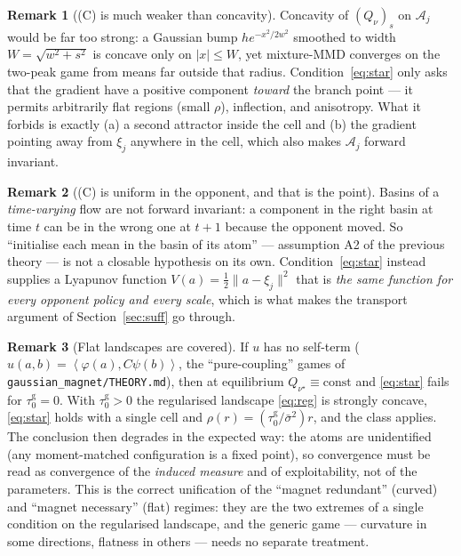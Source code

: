 \documentclass[11pt]{article}
\theoremstyle{definition}
\newtheorem{remark}{Remark}
\newcommand{\cA}{\mathcal{A}}
\newcommand{\ip}[2]{\left\langle #1, #2 \right\rangle}
\begin{document}
\begin{remark}[(C) is much weaker than concavity]
Concavity of $(Q_\nu)_s$ on $\cA_j$ would be far too strong: a Gaussian bump
$h e^{-x^2/2w^2}$ smoothed to width $W = \sqrt{w^2+s^2}$ is concave only on
$|x| \le W$, yet mixture-MMD converges on the two-peak game from means far
outside that radius. Condition~\eqref{eq:star} only asks that the gradient have a
positive component \emph{toward} the branch point --- it permits arbitrarily flat
regions (small $\rho$), inflection, and anisotropy. What it forbids is exactly
(a) a second attractor inside the cell and (b) the gradient pointing away from
$\xi_j$ anywhere in the cell, which also makes $\cA_j$ forward invariant.
\end{remark}

\begin{remark}[(C) is uniform in the opponent, and that is the point]
Basins of a \emph{time-varying} flow are not forward invariant: a component in
the right basin at time $t$ can be in the wrong one at $t+1$ because the opponent
moved. So ``initialise each mean in the basin of its atom'' --- assumption A2 of
the previous theory --- is not a closable hypothesis on its own.
Condition~\eqref{eq:star} instead supplies a Lyapunov function
$V(a) = \tfrac12\|a - \xi_j\|^2$ that is \emph{the same function for every
opponent policy and every scale}, which is what makes the transport argument of
Section~\ref{sec:suff} go through.
\end{remark}

\begin{remark}[Flat landscapes are covered]\label{rem:flat}
If $u$ has no self-term ($u(a,b) = \ip{\varphi(a)}{C\psi(b)}$, the
``pure-coupling'' games of \texttt{gaussian\_magnet/THEORY.md}), then at
equilibrium $Q_{\nu^\star} \equiv \mathrm{const}$ and \eqref{eq:star} fails for
$\tau^{\mathrm g}_0 = 0$. With $\tau^{\mathrm g}_0 > 0$ the regularised landscape
\eqref{eq:reg} is strongly concave, \eqref{eq:star} holds with a single cell and
$\rho(r) = (\tau^{\mathrm g}_0/\bar\sigma^2) r$, and the class applies. The
conclusion then degrades in the expected way: the atoms are unidentified (any
moment-matched configuration is a fixed point), so convergence must be read as
convergence of the \emph{induced measure} and of exploitability, not of the
parameters. This is the correct unification of the ``magnet redundant'' (curved)
and ``magnet necessary'' (flat) regimes: they are the two extremes of a single
condition on the regularised landscape, and the generic game --- curvature in
some directions, flatness in others --- needs no separate treatment.
\end{remark}
\end{document}
